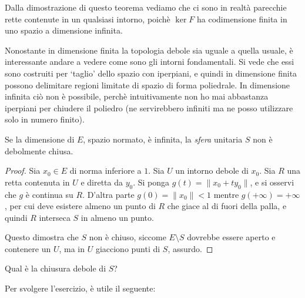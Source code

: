 \begin{remark}
	Dalla dimostrazione di questo teorema vediamo che ci sono in realtà parecchie rette contenute in un qualsiasi intorno, poichè $\ker F$ ha codimensione finita in uno spazio a dimensione infinita.
\end{remark}

Nonostante in dimensione finita la topologia debole sia uguale a quella usuale, è interessante andare a vedere come sono gli intorni fondamentali. Si vede che essi sono costruiti per `taglio' dello spazio con iperpiani, e quindi in dimensione finita possono delimitare regioni limitate di spazio di forma poliedrale.
In dimensione infinita ciò non è possibile, perchè intuitivamente non ho mai abbastanza iperpiani per chiudere il poliedro (ne servirebbero infiniti ma ne posso utilizzare solo in numero finito).

\begin{corollary}
	Se la dimensione di $E$, spazio normato, è infinita, la \emph{sfera} unitaria $S$ non è debolmente chiusa.
\end{corollary}
\begin{proof}
	Sia $x_0 \in E$ di norma inferiore a $1$. Sia $U$ un intorno debole di $x_0$. Sia $R$ una retta contenuta in $U$ e diretta da $y_0$. Si ponga $g(t) = \|x_0 + ty_0\|$, e si osservi che $g$ è continua su $R$. D'altra parte $g(0) = \|x_0\| < 1$ mentre $g(+\infty) = + \infty$, per cui deve esistere almeno un punto di $R$ che giace al di fuori della palla, e quindi $R$ interseca $S$ in almeno un punto.

	Questo dimostra che $S$ non è chiuso, siccome $E \setminus S$ dovrebbe essere aperto e contenere un $U$, ma in $U$ giacciono punti di $S$, assurdo.
\end{proof}

\begin{exercise}
	Qual è la chiusura debole di $S$?
\end{exercise}

Per svolgere l'esercizio, è utile il seguente:

